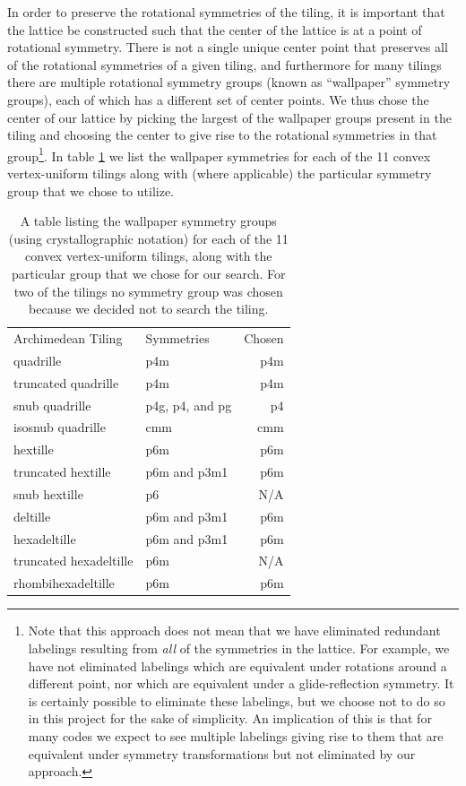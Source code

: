 \documentclass{amsbook}
\theoremstyle{plain}
\theoremstyle{definition}
\theoremstyle{remark}
\begin{document}
In order to preserve the rotational symmetries of the tiling, it is important that the lattice be constructed such that the center of the lattice is at a point of rotational symmetry.  There is not a single unique center point that preserves all of the rotational symmetries of a given tiling, and furthermore for many tilings there are multiple rotational symmetry groups (known as ``wallpaper'' symmetry groups), each of which has a different set of center points.  We thus chose the center of our lattice by picking the largest of the wallpaper groups present in the tiling and choosing the center to give rise to the rotational symmetries in that group\footnote{Note that this approach does not mean that we have eliminated redundant labelings resulting from \emph{all} of the symmetries in the lattice.  For example, we have not eliminated labelings which are equivalent under rotations around a different point, nor which are equivalent under a glide-reflection symmetry.  It is certainly possible to eliminate these labelings, but we choose not to do so in this project for the sake of simplicity.  An implication of this is that for many codes we expect to see multiple labelings giving rise to them that are equivalent under symmetry transformations but not eliminated by our approach.}.  In table \ref{table:symmetries} we list the wallpaper symmetries for each of the 11 convex vertex-uniform tilings along with (where applicable) the particular symmetry group that we chose to utilize.

\begin{table}
\begin{tabular}{llr}
\toprule
Archimedean Tiling & Symmetries & Chosen\\
quadrille & p4m & p4m \\
truncated quadrille & p4m & p4m \\
snub quadrille & p4g, p4, and pg & p4 \\
isosnub quadrille & cmm & cmm \\
hextille & p6m & p6m \\
truncated hextille & p6m and p3m1 & p6m \\
snub hextille & p6 & N/A \\
deltille & p6m and p3m1 & p6m \\
hexadeltille & p6m and p3m1 & p6m \\
truncated hexadeltille & p6m & N/A \\
rhombihexadeltille & p6m & p6m \\
\bottomrule
\end{tabular}
\caption[Symmetry groups of the tilings]{
\label{table:symmetries}
A table listing the wallpaper symmetry groups (using crystallographic notation) for each of the 11 convex vertex-uniform tilings, along with the particular group that we chose for our search.  For two of the tilings no symmetry group was chosen because we decided not to search the tiling.
}
\end{table}
\end{document}
